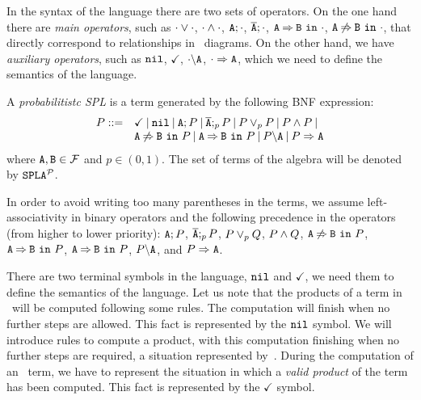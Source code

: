 In the syntax of the language there are two sets of operators.
On the one hand there are \emph{main operators}, such as $\cdot\choice\cdot$, $\cdot\paral\cdot$, $\feature{A};\cdot$, $\ofeature{A};\cdot$,
$\require{A}{B}{\cdot}$, $\exclude{A}{B}{\cdot}$,
that directly correspond to relationships in \FODA\ diagrams.
On the other hand, we have \emph{auxiliary operators}, such as $\nil$, $\checkmark$, $\forbid{A}{\cdot}$, $\mandatory{A}{\cdot}$,
which we need to define the semantics of the language.


\bdfn
\label{dfn:syntax}
A \emph{probabilitistc SPL} is a term generated by the following
BNF expression:
$$
\begin{array}{ll}
P::=& \checkmark \barra \nil \barra \feature{A};P \barra
\ofeature{A};_{p} P \barra P \choice_{p} P \barra P \paral P \barra
\\
& \exclude{A}{B}{P}\barra  \require{A}{B}{P}\barra  \forbid{A}{P}\barra  \mandatory{A}{P}\\
\end{array}
$$
\noindent
where $\feature{A},\feature{B} \in \calF$ and $p\in(0,1)$. The set of terms of the
algebra will be denoted by  $\fodaPAp$.
\edfn



In order to avoid writing too many parentheses in the terms, we
assume left-associativity in binary operators and  the
following precedence in the operators (from higher to lower priority):
$\feature{A};P$, $\ofeature{A};_{p} P$, $ P \choice_{p} Q$, $P\paral Q$,
$\exclude{A}{B}{P}$, $\require{A}{B}{P}$,
$\require{A}{B}{P}$,  $\forbid{A}{P}$, and $\mandatory{A}{P}$.



There are two terminal symbols in
the language, $\nil$ and $\checkmark$,
we need them to define the semantics of the language.
Let us note that the products of a term in \fodaPA\ will be computed following some rules.
The computation will finish when no further steps are allowed.
This fact is represented by the $\nil$ symbol.
We will introduce rules to compute a product, with this computation
finishing when no further steps are required, a situation represented by~\nil.
During the computation of an \fodaPAp\ term,  we have
to represent the situation in which a \emph{valid product}
of the term has been computed.
This fact is represented by the $\checkmark$ symbol.

